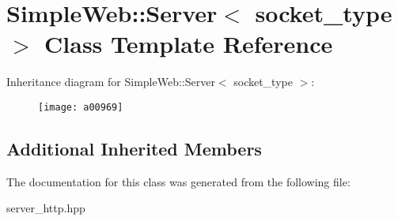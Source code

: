 \hypertarget{a00969}{}\section{Simple\+Web\+:\+:Server$<$ socket\+\_\+type $>$ Class Template Reference}
\label{a00969}
Inheritance diagram for Simple\+Web\+:\+:Server$<$ socket\+\_\+type $>$\+:\begin{figure}[H]
\begin{center}
\leavevmode
\texttt{[image: a00969]}
\end{center}
\end{figure}
\subsection*{Additional Inherited Members}


The documentation for this class was generated from the following file\+:\begin{DoxyCompactItemize}
\item 
server\+\_\+http.\+hpp\end{DoxyCompactItemize}
